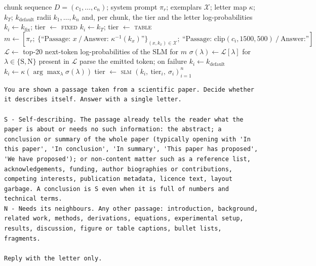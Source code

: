 \documentclass[pdflatex,sn-mathphys-num]{sn-jnl}
\theoremstyle{thmstyleone}%
\theoremstyle{thmstylethree}%
\begin{document}
\begin{algorithm}[htbp]
\caption{Two-tier radius routing for one document (as implemented in \texttt{utils/dynamic\_slice\_prediction.py})}\label{alg:router}
\begin{algorithmic}[1]
\Require chunk sequence $D=(c_1,\dots,c_n)$; system prompt $\pi_r$; exemplars $\mathcal X$; letter map $\kappa$; $k_T$; $k_{\mathrm{default}}$
\Ensure radii $k_1,\dots,k_n$ and, per chunk, the tier and the letter log-probabilities
    \State $k_i\gets k_{\mathrm{fix}}$; tier $\gets$ \textsc{fixed}
    \State $k_i\gets k_T$; tier $\gets$ \textsc{table}
  \Else
    \State $m\gets[\pi_r;\ \{\text{``Passage: } x\ /\ \text{Answer: } \kappa^{-1}(k_x)\text{''}\}_{(x,k_x)\in\mathcal X};\ \text{``Passage: } \mathrm{clip}(c_i,1500,500)\ /\ \text{Answer:''}]$
    \State $\mathcal L\gets$ top-20 next-token log-probabilities of the SLM for $m$ 
    \State $\sigma(\lambda)\gets \mathcal L[\lambda]$ for $\lambda\in\{\mathrm S,\mathrm N\}$ present in $\mathcal L$
    \If{$\sigma=\emptyset$} \State parse the emitted token; on failure $k_i\gets k_{\mathrm{default}}$
    \Else \State $k_i\gets\kappa(\arg\max_\lambda \sigma(\lambda))$
    \EndIf
    \State tier $\gets$ \textsc{slm}
  \EndIf
\EndFor
\State \Return $(k_i,\ \text{tier}_i,\ \sigma_i)_{i=1}^{n}$ 
\end{algorithmic}
\end{algorithm}

\begin{lstlisting}[caption={System prompt of the two-class routing agent (\texttt{BINARY\_SYSTEM\_PROMPT} in \texttt{utils/dynamic\_slice\_prediction.py}).},label={lst:router}]
You are shown a passage taken from a scientific paper. Decide whether it describes itself. Answer with a single letter.

S - Self-describing. The passage already tells the reader what the paper is about or needs no such information: the abstract; a conclusion or summary of the whole paper (typically opening with 'In this paper', 'In conclusion', 'In summary', 'This paper has proposed', 'We have proposed'); or non-content matter such as a reference list, acknowledgements, funding, author biographies or contributions, competing interests, publication metadata, licence text, layout garbage. A conclusion is S even when it is full of numbers and technical terms.
N - Needs its neighbours. Any other passage: introduction, background, related work, methods, derivations, equations, experimental setup, results, discussion, figure or table captions, bullet lists, fragments.

Reply with the letter only.
\end{lstlisting}
\end{document}
